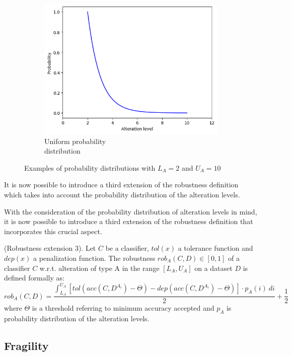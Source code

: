 \begin{figure}[h]
\begin{subfigure}{.33\textwidth}
		\includegraphics[width=0.9\linewidth]{ImageFiles/ANNRob/exp_prob}
		\caption{Uniform probability \\ distribution}
		\label{fig:exp_prob}
	\end{subfigure}
	\caption{Examples of probability distributions with $L_A=2$ and $U_A=10$}
	\label{fig:prob_examp}
\end{figure}

It is now possible to introduce a third extension of the robustness definition which takes into account the probability distribution of the alteration levels. 

With the consideration of the probability distribution of alteration levels in mind, it is now possible to introduce a third extension of the robustness definition that incorporates this crucial aspect.

\begin{definition}\label{def:rob3} (Robustness extension 3).
	Let $C$ be a classifier, $tol(x)$ a tolerance function and $dep(x)$ a penalization function.
	The robustness $rob_A(C,D) \in [0,1]$ of a classifier $C$ w.r.t. alteration of type A in the range $[L_A, U_A]$ on a dataset $D$ is defined formally as:
	\[
	rob_A(C,D) = \frac{\int_{L_A}^{U_A} [tol(acc(C,D^{A_i}) - \Theta) - dep(acc(C,D^{A_i}) - \Theta)] \cdot p_A(i)\ di}{2} + \frac{1}{2}
	\]
	where $\Theta$ is a threshold referring to minimum accuracy accepted and $p_A$ is probability distribution of the alteration levels.
\end{definition}


\subsection{Fragility}

